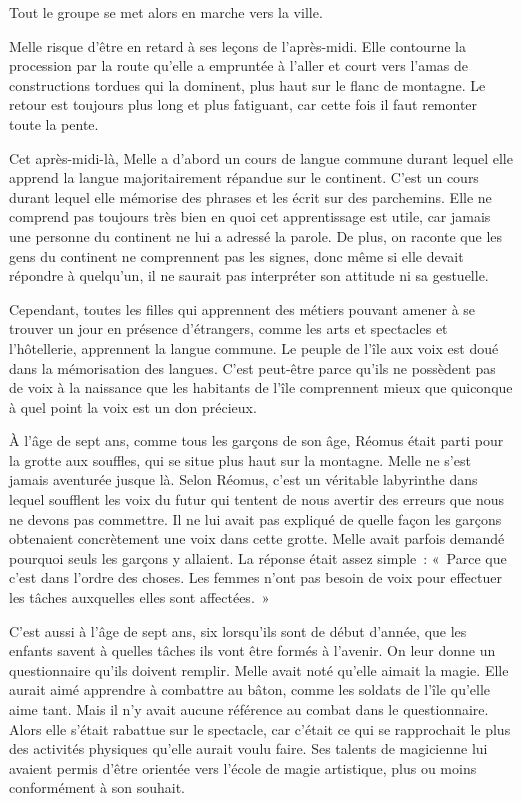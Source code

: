 Tout le groupe se met alors en marche vers la ville.

Melle risque d'être en retard à ses leçons de l'après-midi. Elle contourne la procession par la route qu'elle a empruntée à l'aller et court vers l'amas de constructions tordues qui la dominent, plus haut sur le flanc de montagne. Le retour est toujours plus long et plus fatiguant, car cette fois il faut remonter toute la pente.

\parbr

Cet après-midi-là, Melle a d'abord un cours de langue commune durant lequel elle apprend la langue majoritairement répandue sur le continent. C'est un cours durant lequel elle mémorise des phrases et les écrit sur des parchemins. Elle ne comprend pas toujours très bien en quoi cet apprentissage est utile, car jamais une personne du continent ne lui a adressé la parole. De plus, on raconte que les gens du continent ne comprennent pas les signes, donc même si elle devait répondre à quelqu'un, il ne saurait pas interpréter son attitude ni sa gestuelle.

Cependant, toutes les filles qui apprennent des métiers pouvant amener à se trouver un jour en présence d'étrangers, comme les arts et spectacles et l'hôtellerie, apprennent la langue commune. Le peuple de l'île aux voix est doué dans la mémorisation des langues. C'est peut-être parce qu'ils ne possèdent pas de voix à la naissance que les habitants de l'île comprennent mieux que quiconque à quel point la voix est un don précieux.

À l'âge de sept ans, comme tous les garçons de son âge, Réomus était parti pour la grotte aux souffles, qui se situe plus haut sur la montagne. Melle ne s'est jamais aventurée jusque là. Selon Réomus, c'est un véritable labyrinthe dans lequel soufflent les voix du futur qui tentent de nous avertir des erreurs que nous ne devons pas commettre. Il ne lui avait pas expliqué de quelle façon les garçons obtenaient concrètement une voix dans cette grotte. Melle avait parfois demandé pourquoi seuls les garçons y allaient. La réponse était assez simple~: «~Parce que c'est dans l'ordre des choses. Les femmes n'ont pas besoin de voix pour effectuer les tâches auxquelles elles sont affectées.~»

C'est aussi à l'âge de sept ans, six lorsqu'ils sont de début d'année, que les enfants savent à quelles tâches ils vont être formés à l'avenir. On leur donne un questionnaire qu'ils doivent remplir. Melle avait noté qu'elle aimait la magie. Elle aurait aimé apprendre à combattre au bâton, comme les soldats de l'île qu'elle aime tant. Mais il n'y avait aucune référence au combat dans le questionnaire. Alors elle s'était rabattue sur le spectacle, car c'était ce qui se rapprochait le plus des activités physiques qu'elle aurait voulu faire. Ses talents de magicienne lui avaient permis d'être orientée vers l'école de magie artistique, plus ou moins conformément à son souhait.


